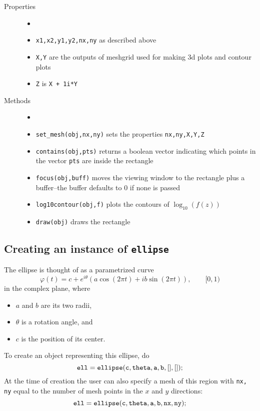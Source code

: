 \begin{description}
 \item[Properties]
   \begin{itemize}
    \item[]
    \item {\tt x1,x2,y1,y2,nx,ny} as described above
    \item {\tt X,Y} are the outputs of meshgrid used for
          making 3d plots and contour plots
    \item {\tt Z} is {\tt X + 1i*Y}
   \end{itemize}
 \item[Methods]
   \begin{itemize}
    \item[]
    \item {\tt set\_mesh(obj,nx,ny)} sets the properties
          {\tt nx,ny,X,Y,Z}
    \item {\tt contains(obj,pts)} returns a boolean vector
          indicating which points in the vector {\tt pts}
          are inside the rectangle
    \item {\tt focus(obj,buff)} moves the viewing window to
          the rectangle plus a buffer--the buffer defaults to
          0 if none is passed
    \item {\tt log10contour(obj,f)} plots the contours of
          $\log_{10}(f(z))$
    \item {\tt draw(obj)} draws the rectangle
   \end{itemize}
\end{description}

\subsection{Creating an instance of {\tt ellipse}}

The ellipse is thought of as a parametrized curve
\begin{equation}
 \varphi(t) = c + e^{i\theta}\left(a\cos(2\pi t) + ib\sin(2\pi t)\right),
 \qquad
 [0,1)
\end{equation}
in the complex plane, where
\begin{itemize}
 \item $a$ and $b$ are its two radii,
 \item $\theta$ is a rotation angle, and
 \item $c$ is the position of its center.
\end{itemize}
To create an object representing this ellipse, do
\begin{equation}
 {\tt ell = ellipse(c,theta,a,b,[],[]);}
\end{equation}
At the time of creation the user can also specify a mesh of this region 
with {\tt nx, ny} equal to the number of mesh points in the
$x$ and $y$ directions:
\begin{equation}
 {\tt ell = ellipse(c,theta,a,b,nx,ny);}
\end{equation}

